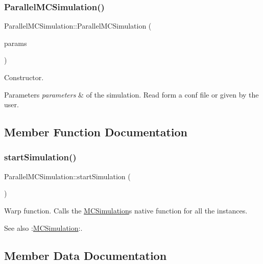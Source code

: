 \subsubsection{\texorpdfstring{Parallel\+M\+C\+Simulation()}{ParallelMCSimulation()}\hspace{0.1cm}{\footnotesize\ttfamily [2/2]}}
{\footnotesize\ttfamily Parallel\+M\+C\+Simulation\+::\+Parallel\+M\+C\+Simulation (\begin{DoxyParamCaption}\item[{\hyperlink{class_parameters}{Parameters} \&}]{params }\end{DoxyParamCaption})}



Constructor. 


\begin{DoxyParams}{Parameters}
{\em parameters} & of the simulation. Read form a conf file or given by the user. \\
\hline
\end{DoxyParams}


\subsection{Member Function Documentation}
\mbox{\label{class_parallel_m_c_simulation_a7d9420ac20b19cb1c74f81bdbad94196}} 
\subsubsection{\texorpdfstring{start\+Simulation()}{startSimulation()}}
{\footnotesize\ttfamily Parallel\+M\+C\+Simulation\+::start\+Simulation (\begin{DoxyParamCaption}{ }\end{DoxyParamCaption})}



Warp function. Calls the \hyperlink{class_m_c_simulation}{M\+C\+Simulation}\textquotesingle{}s native function for all the instances. 

\begin{DoxySeeAlso}{See also}
\+:\hyperlink{class_m_c_simulation}{M\+C\+Simulation}\+:. 
\end{DoxySeeAlso}


\subsection{Member Data Documentation}
\mbox{\label{class_parallel_m_c_simulation_aa51edc0c79c6ae66ddd0046d21b871d4}} 
